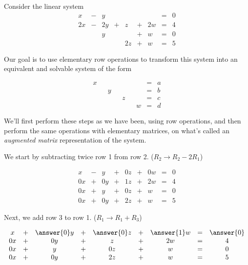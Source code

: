 \documentclass{ximera}
\begin{document}
\begin{example}
Consider the linear system
\begin{equation}
  \begin{array}{ccccccccc}
      x &- &y&&&&&= &0 \\
     2x& -&2y&+&z&+&2w&=&4\\
     & &y&&&+&w&=&0\\
     & &&&2z&+&w&=&5
  \end{array}
\end{equation}

Our goal is to use elementary row operations to transform this system into an equivalent and solvable system of the form

\begin{equation}\begin{array}{ccccccccc}
      x & &&&&&&= &a \\
     & &y&&&&&=&b\\
     & &&&z&&&=&c\\
     & &&&&&w&=&d
    \end{array}
    \end{equation}  
  
We'll first perform these steps as we have been, using row operations, and then perform the same operations with elementary matrices, on what's called an \emph{augmented matrix} representation of the system.

We start by subtracting twice row 1 from row 2. ($R_2\rightarrow R_2-2R_1$)
 
$$\begin{matrix}
      x &- &y&+&0z&+&0w&= &0 \\
     0x& +&0y&+& 1z&+& 2w&=& 4\\
     0x& +&y&+&0z&+&w&=&0\\
     0x&+&0y&+&2z&+&w&=&5
    \end{matrix}$$

Next, we add row 3 to row 1. ($R_1\rightarrow R_1+R_3$) 

\begin{prompt}
 $$\begin{matrix}
      x &+ & \answer{0}y&+&\answer{0}z&+& \answer{1}w&= & \answer{0} \\
     0x& +&0y&+&z&+&2w&=&4\\
     0x& +&y&+&0z&+&w&=&0\\
     0x&+&0y&+&2z&+&w&=&5
    \end{matrix}$$
\end{prompt}



\end{example}
\end{document}
